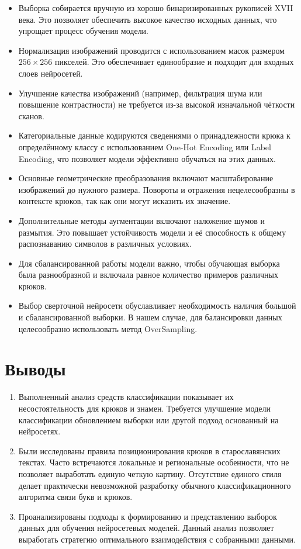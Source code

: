 \begin{itemize}
	\item Выборка собирается вручную из хорошо бинаризированных рукописей XVII века. Это позволяет обеспечить высокое качество исходных данных, что упрощает процесс обучения модели.
	\item Нормализация изображений проводится с использованием масок размером \(256 \times 256\) пикселей. Это обеспечивает единообразие и подходит для входных слоев нейросетей.
	\item Улучшение качества изображений (например, фильтрация шума или повышение контрастности) не требуется из-за высокой изначальной чёткости сканов.
	\item Категориальные данные кодируются сведениями о принадлежности крюка к определённому классу с использованием One-Hot Encoding или Label Encoding, что позволяет модели эффективно обучаться на этих данных.
	\item Основные геометрические преобразования включают масштабирование изображений до нужного размера. Повороты и отражения нецелесообразны в контексте крюков, так как они могут исказить их значение.
	\item Дополнительные методы аугментации включают наложение шумов и размытия. Это повышает устойчивость модели и её способность к общему распознаванию символов в различных условиях.
	\item Для сбалансированной работы модели важно, чтобы обучающая выборка была разнообразной и включала равное количество примеров различных крюков.
	\item Выбор сверточной нейросети обуславливает необходимость наличия большой и сбалансированной выборки. В нашем случае, для балансировки данных целесообразно использовать метод OverSampling.
\end{itemize}

\section{Выводы}

\begin{enumerate}
	\item Выполненный анализ средств классификации показывает их несостоятельность для крюков и знамен. Требуется
		улучшение модели классификации обновлением выборки или другой подход основанный на нейросетях.

	\item  Были исследованы правила позиционирования крюков в старославянских текстах. Часто встречаются локальные 
		и региональные особенности, что не позволяет выработать единую четкую картину. Отсутствие единого 
		стиля делает практически невозможной разработку обычного классификационного алгоритма связи букв и крюков.

	\item Проанализированы подходы к формированию и представлению выборок данных для обучения нейросетевых 
		моделей. Данный анализ позволяет выработать стратегию оптимального взаимодействия с собранными данными.
\end{enumerate}



